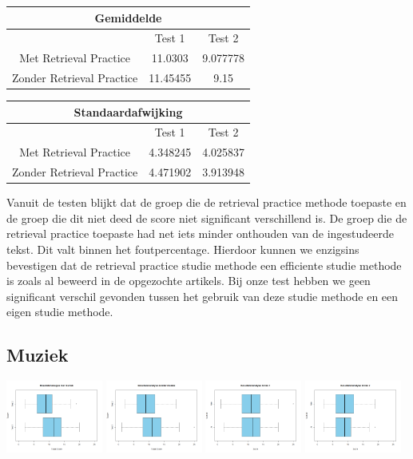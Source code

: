 \documentclass{hogent-article}
\begin{document}
	\begin{tabular}{ |c|c|c| }
		\hline
			\multicolumn{3}{|c|}{Gemiddelde} \\
		\hline
			& Test 1 & Test 2 \\
		\hline
			Met Retrieval Practice & 11.0303 & 9.077778 \\
			Zonder Retrieval Practice & 11.45455 & 9.15 \\
		\hline
	\end{tabular}

	\begin{tabular}{ |c|c|c| }
	\hline
		\multicolumn{3}{|c|}{Standaardafwijking} \\
	\hline
		& Test 1 & Test 2 \\
	\hline
		Met Retrieval Practice & 4.348245 & 4.025837 \\
		Zonder Retrieval Practice & 4.471902 & 3.913948 \\
	\hline
	\end{tabular}
	
	Vanuit de testen blijkt dat de groep die de retrieval practice methode toepaste en de groep die dit niet deed de score niet significant verschillend is. De groep die de retrieval practice toepaste had net iets minder onthouden van de ingestudeerde tekst. Dit valt binnen het foutpercentage. Hierdoor kunnen we enzigsins bevestigen dat de retrieval practice studie methode een efficiente studie methode is zoals al beweerd in de opgezochte artikels. Bij onze test hebben we geen significant verschil gevonden tussen het gebruik van deze studie methode en een eigen studie methode.
	
	\subsection{Muziek}
	\includegraphics[width=120px]{Rplot_MetMuziek}	
	\includegraphics[width=120px]{Rplot_ZonderMuziek}
	\includegraphics[width=120px]{Rplot_Muziek_Score1}
	\includegraphics[width=120px]{Rplot_Muziek_Score2}
	
\end{document}
